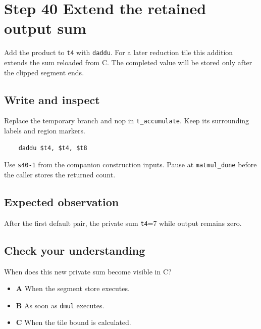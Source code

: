 \section{Step 40 Extend the retained output sum}\label{matmul-s40}

Add the product to \texttt{t4} with \texttt{daddu}. For a later reduction tile this addition extends the sum reloaded from C. The completed value will be stored only after the clipped segment ends.

\subsection{Write and inspect}
Replace the temporary branch and nop in \texttt{t\_accumulate}. Keep its surrounding labels and region markers.

\begin{verbatim}
    daddu $t4, $t4, $t8
\end{verbatim}
Use \texttt{s40-1} from the companion construction inputs. Pause at \texttt{matmul\_done} before the caller stores the returned count.

\subsection{Expected observation}
After the first default pair, the private sum \texttt{t4}=7 while output remains zero.

\subsection{Check your understanding}
When does this new private sum become visible in C?

\begin{itemize}
  \item \textbf{A} When the segment store executes.
  \item \textbf{B} As soon as \texttt{dmul} executes.
  \item \textbf{C} When the tile bound is calculated.
\end{itemize}
